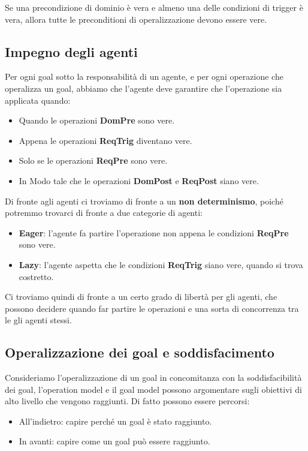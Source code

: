\begin{tcolorbox}[title=Consistenza]
    Se una precondizione di dominio è vera e almeno una delle condizioni di trigger 
    è vera, allora tutte le preconditioni di operalizzazione devono essere vere.
\end{tcolorbox}

\subsection{Impegno degli agenti}
Per ogni goal sotto la responsabilità di un agente, e per ogni operazione che 
operalizza un goal, abbiamo che l'agente deve garantire che l'operazione sia 
applicata quando:
\begin{itemize}
    \item Quando le operazioni \textbf{DomPre} sono vere.
    \item Appena le operazioni \textbf{ReqTrig} diventano vere.
    \item Solo se le operazioni \textbf{ReqPre} sono vere.
    \item In Modo tale che le operazioni \textbf{DomPost} e \textbf{ReqPost} siano vere.
\end{itemize}
Di fronte agli agenti ci troviamo di fronte a un \textbf{non determinismo}, poiché potremmo 
trovarci di fronte a due categorie di agenti:
\begin{itemize}
    \item \textbf{Eager}: l'agente fa partire l'operazione non appena
    le condizioni \textbf{ReqPre} sono vere.
    \item \textbf{Lazy}: l'agente aspetta che le condizioni \textbf{ReqTrig}
    siano vere, quando si trova costretto.
\end{itemize}
Ci troviamo quindi di fronte a un certo grado di libertà per gli agenti, che
possono decidere quando far partire le operazioni e una sorta di concorrenza
tra le gli agenti stessi.
\subsection{Operalizzazione dei goal e soddisfacimento}
Consideriamo l'operalizzazione di un goal in concomitanza con la soddisfacibilità
dei goal, l'operation model e il goal model possono argomentare sugli obiettivi di 
alto livello che vengono raggiunti.
Di fatto possono essere percorsi:
\begin{itemize}
    \item All'indietro: capire perché un goal è stato raggiunto.
    \item In avanti: capire come un goal può essere raggiunto.
\end{itemize}
